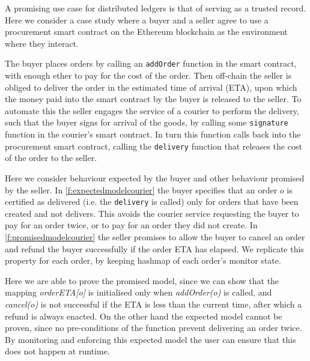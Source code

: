 A promising use case for distributed ledgers is that of serving as a trusted record. Here we consider a case study where a buyer and a seller agree to use a procurement smart contract on the Ethereum blockchain as the environment where they interact. 

The buyer places orders by calling an \texttt{addOrder} function in the smart contract, with enough ether to pay for the cost of the order. Then off-chain the seller is obliged to deliver the order in the estimated time of arrival (ETA), upon which the money paid into the smart contract by the buyer is released to the seller. To automate this the seller engages the service of a courier to perform the delivery, such that the buyer signs for arrival of the goods, by calling some \texttt{signature} function in the courier's smart contract. In turn this function calls back into the procurement smart contract, calling the \texttt{delivery} function that releases the cost of the order to the seller. 

Here we consider behaviour expected by the buyer and other behaviour promised by the seller. In \ref{f:expectedmodelcourier} the buyer specifies that an order $o$ is certified as delivered (i.e. the \texttt{delivery} is called) only for orders that have been created and not delivers. This avoids the courier service requesting the buyer to pay for an order twice, or to pay for an order they did not create. In \ref{f:promisedmodelcourier} the seller promises to allow the buyer to cancel an order and refund the buyer successfully if the order ETA has elapsed. We replicate this property for each order, by keeping hashmap of each order's monitor state.

Here we are able to prove the promised model, since we can show that the mapping \textit{orderETA[o]} is initialised only when \textit{addOrder(o)} is called, and \textit{cancel(o)} is not successful if the ETA is less than the current time, after which a refund is always enacted. On the other hand the expected model cannot be proven, since no pre-conditions of the function prevent delivering an order twice. By monitoring and enforcing this expected model the user can ensure that this does not happen at runtime.


